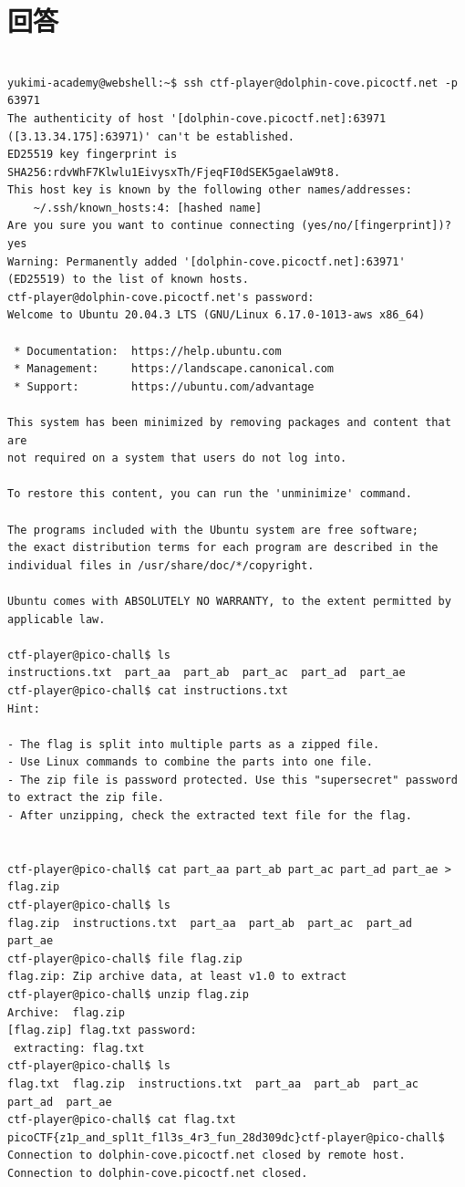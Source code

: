 \documentclass[a4paper,11pt,lualatex,ja=standard]{bxjsarticle}
\begin{document}
\section{回答}
\begin{verbatim}

yukimi-academy@webshell:~$ ssh ctf-player@dolphin-cove.picoctf.net -p 63971
The authenticity of host '[dolphin-cove.picoctf.net]:63971 ([3.13.34.175]:63971)' can't be established.
ED25519 key fingerprint is SHA256:rdvWhF7Klwlu1EivysxTh/FjeqFI0dSEK5gaelaW9t8.
This host key is known by the following other names/addresses:
    ~/.ssh/known_hosts:4: [hashed name]
Are you sure you want to continue connecting (yes/no/[fingerprint])? yes
Warning: Permanently added '[dolphin-cove.picoctf.net]:63971' (ED25519) to the list of known hosts.
ctf-player@dolphin-cove.picoctf.net's password: 
Welcome to Ubuntu 20.04.3 LTS (GNU/Linux 6.17.0-1013-aws x86_64)

 * Documentation:  https://help.ubuntu.com
 * Management:     https://landscape.canonical.com
 * Support:        https://ubuntu.com/advantage

This system has been minimized by removing packages and content that are
not required on a system that users do not log into.

To restore this content, you can run the 'unminimize' command.

The programs included with the Ubuntu system are free software;
the exact distribution terms for each program are described in the
individual files in /usr/share/doc/*/copyright.

Ubuntu comes with ABSOLUTELY NO WARRANTY, to the extent permitted by
applicable law.

ctf-player@pico-chall$ ls
instructions.txt  part_aa  part_ab  part_ac  part_ad  part_ae
ctf-player@pico-chall$ cat instructions.txt 
Hint:

- The flag is split into multiple parts as a zipped file.
- Use Linux commands to combine the parts into one file.
- The zip file is password protected. Use this "supersecret" password to extract the zip file.
- After unzipping, check the extracted text file for the flag.


ctf-player@pico-chall$ cat part_aa part_ab part_ac part_ad part_ae > flag.zip
ctf-player@pico-chall$ ls
flag.zip  instructions.txt  part_aa  part_ab  part_ac  part_ad  part_ae
ctf-player@pico-chall$ file flag.zip 
flag.zip: Zip archive data, at least v1.0 to extract
ctf-player@pico-chall$ unzip flag.zip 
Archive:  flag.zip
[flag.zip] flag.txt password: 
 extracting: flag.txt                
ctf-player@pico-chall$ ls
flag.txt  flag.zip  instructions.txt  part_aa  part_ab  part_ac  part_ad  part_ae
ctf-player@pico-chall$ cat flag.txt 
picoCTF{z1p_and_spl1t_f1l3s_4r3_fun_28d309dc}ctf-player@pico-chall$ Connection to dolphin-cove.picoctf.net closed by remote host.
Connection to dolphin-cove.picoctf.net closed.
\end{verbatim}
\end{document}
